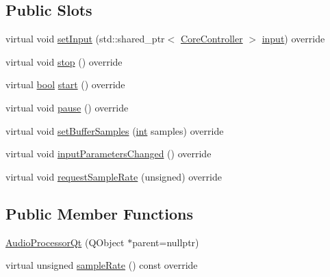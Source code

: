 \subsection*{Public Slots}
\begin{DoxyCompactItemize}
\item 
virtual void \mbox{\hyperlink{class_q_g_b_a_1_1_audio_processor_qt_acdfbfc0d757eaa87e39dc48ee8006bfd}{set\+Input}} (std\+::shared\+\_\+ptr$<$ \mbox{\hyperlink{class_q_g_b_a_1_1_core_controller}{Core\+Controller}} $>$ \mbox{\hyperlink{class_q_g_b_a_1_1_audio_processor_ad9001a38e63be82cbb2e582ac4162db9}{input}}) override
\item 
virtual void \mbox{\hyperlink{class_q_g_b_a_1_1_audio_processor_qt_a5b4b772046e56db6be5047e88d6d27ae}{stop}} () override
\item 
virtual \mbox{\hyperlink{libretro_8h_a4a26dcae73fb7e1528214a068aca317e}{bool}} \mbox{\hyperlink{class_q_g_b_a_1_1_audio_processor_qt_ad6e05f0d076d2f7dce9f33074d0c7702}{start}} () override
\item 
virtual void \mbox{\hyperlink{class_q_g_b_a_1_1_audio_processor_qt_afbf14d57f8dcfb2bbb0a7b20682e168f}{pause}} () override
\item 
virtual void \mbox{\hyperlink{class_q_g_b_a_1_1_audio_processor_qt_a19485cf3431ff7d1617161883ce43e1d}{set\+Buffer\+Samples}} (\mbox{\hyperlink{ioapi_8h_a787fa3cf048117ba7123753c1e74fcd6}{int}} samples) override
\item 
virtual void \mbox{\hyperlink{class_q_g_b_a_1_1_audio_processor_qt_aa9ecd58bccdd2e5425a796583b083722}{input\+Parameters\+Changed}} () override
\item 
virtual void \mbox{\hyperlink{class_q_g_b_a_1_1_audio_processor_qt_abb48e61d52109aca94ea5803fd97e550}{request\+Sample\+Rate}} (unsigned) override
\end{DoxyCompactItemize}
\subsection*{Public Member Functions}
\begin{DoxyCompactItemize}
\item 
\mbox{\hyperlink{class_q_g_b_a_1_1_audio_processor_qt_ab58822890d3ef384211c0b87a02077c3}{Audio\+Processor\+Qt}} (Q\+Object $\ast$parent=nullptr)
\item 
virtual unsigned \mbox{\hyperlink{class_q_g_b_a_1_1_audio_processor_qt_afe2bf3efb15330553d552a62265061ba}{sample\+Rate}} () const override
\end{DoxyCompactItemize}
